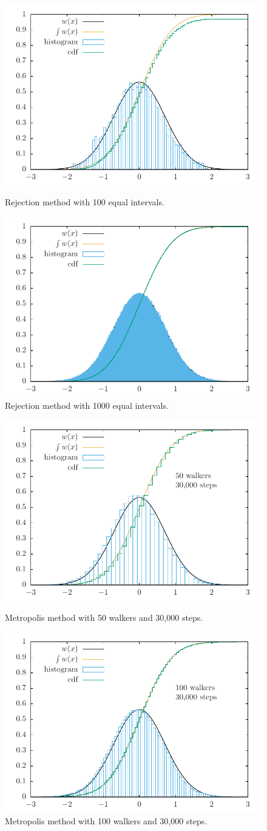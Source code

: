 \documentclass[11pt]{article}
\begin{document}
\begin{figure}[H]
  \centering
  \includegraphics[width=.6\linewidth]{rejection-gaussian100}
  \caption{Rejection method with 100 equal intervals.}
\label{fig:rejection-gaussian100}

  \includegraphics[width=.6\linewidth]{rejection-gaussian1000}
  \caption{Rejection method with 1000 equal intervals.}
\label{fig:rejection-gaussian1000}
\end{figure}

\begin{figure}[H]
  \centering
  \includegraphics[width=.6\linewidth]{metropolis-gaussian50}
  \caption{Metropolis method with 50 walkers and 30,000 steps.}
\label{fig:metropolis-gaussian50}

  \includegraphics[width=.6\linewidth]{metropolis-gaussian100}
  \caption{Metropolis method with 100 walkers and 30,000 steps.}
\label{fig:metropolis-gaussian100}
\end{figure}
\end{document}
